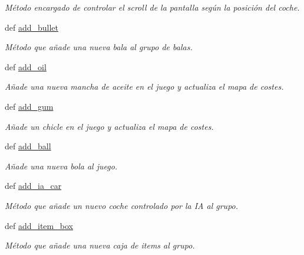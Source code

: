 \begin{DoxyCompactItemize}
\begin{DoxyCompactList}\small\item\em \-Método encargado de controlar el scroll de la pantalla según la posición del coche. \end{DoxyCompactList}\item 
def \hyperlink{classengine_1_1gamecontrol_1_1GameControl_a2b38980fce670780232abac1e8e89c2b}{add\-\_\-bullet}
\begin{DoxyCompactList}\small\item\em \-Método que añade una nueva bala al grupo de balas. \end{DoxyCompactList}\item 
def \hyperlink{classengine_1_1gamecontrol_1_1GameControl_ac5bccabc612709ab5385ed569bd7a609}{add\-\_\-oil}
\begin{DoxyCompactList}\small\item\em \-Añade una nueva mancha de aceite en el juego y actualiza el mapa de costes. \end{DoxyCompactList}\item 
def \hyperlink{classengine_1_1gamecontrol_1_1GameControl_a1d0b27dc3f25c918f02b888c5c855683}{add\-\_\-gum}
\begin{DoxyCompactList}\small\item\em \-Añade un chicle en el juego y actualiza el mapa de costes. \end{DoxyCompactList}\item 
def \hyperlink{classengine_1_1gamecontrol_1_1GameControl_ae3871a6345ea4c73c35d56bf2664aa8d}{add\-\_\-ball}
\begin{DoxyCompactList}\small\item\em \-Añade una nueva bola al juego. \end{DoxyCompactList}\item 
def \hyperlink{classengine_1_1gamecontrol_1_1GameControl_a99610d227ed036ed3c9f52ada1b9adb0}{add\-\_\-ia\-\_\-car}
\begin{DoxyCompactList}\small\item\em \-Método que añade un nuevo coche controlado por la \-I\-A al grupo. \end{DoxyCompactList}\item 
def \hyperlink{classengine_1_1gamecontrol_1_1GameControl_a894da94eb621c16c5c4409329dbc7ea2}{add\-\_\-item\-\_\-box}
\begin{DoxyCompactList}\small\item\em \-Método que añade una nueva caja de items al grupo. \end{DoxyCompactList}\item 

\end{DoxyCompactItemize}
